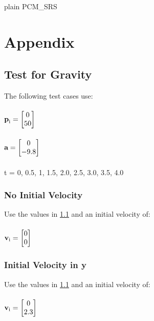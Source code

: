 \documentclass[12pt]{article}
\begin{document}
 {plain}
 {PCM_SRS}


%
%
\section{Appendix}

\subsection{Test for Gravity} \label{testGravity}
The following test cases use:\\ \\
$ \textbf p_\text{i} = \begin{bmatrix}
	0\\
	50\\
	\end{bmatrix}$\\
~\newline 
\noindent \\
$ \textbf a = \begin{bmatrix}
	0\\
	-9.8\\
	\end{bmatrix}$\\
~\newline 
\noindent \\
t = 0, 0.5, 1, 1.5, 2.0, 2.5, 3.0, 3.5, 4.0

\subsubsection{No Initial Velocity} \label{testGravity1}
Use the values in \ref{testGravity} and an initial velocity of: \\ \\
$ \textbf v_\text{i} = \begin{bmatrix}
	0\\
	0\\
	\end{bmatrix}$\\
	
\subsubsection{Initial Velocity in y} \label{testGravity2}
Use the values in \ref{testGravity} and an initial velocity of: \\ \\
$ \textbf v_\text{i} = \begin{bmatrix} 
	0\\
	2.3\\
	\end{bmatrix}$\\
	
\end{document}
